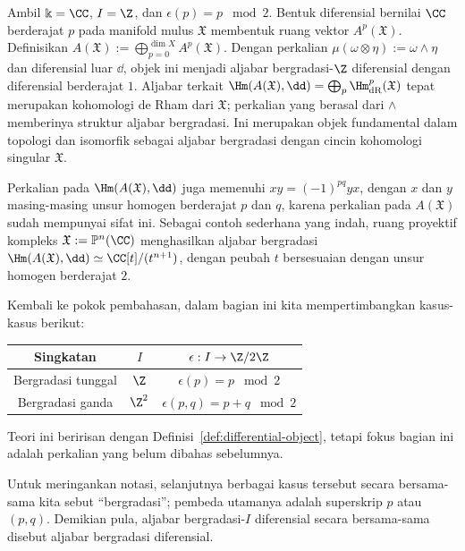 \begin{example}
	Ambil $\Bbbk=\CC$, $I=\Z$, dan $\epsilon(p)=p\;\bmod2$. Bentuk
	diferensial bernilai $\CC$ berderajat $p$ pada manifold mulus
	$\mathfrak{X}$ membentuk ruang vektor $A^p(\mathfrak{X})$. Definisikan
	$A(\mathfrak{X}):=\bigoplus_{p=0}^{\dim X}A^p(\mathfrak{X})$. Dengan
	perkalian $\mu(\omega\otimes\eta):=\omega\wedge\eta$ dan diferensial luar
	$\dd$, objek ini menjadi aljabar bergradasi-$\Z$ diferensial dengan
	diferensial berderajat $1$. Aljabar terkait
	$\Hm(A(\mathfrak{X}),\dd)=\bigoplus_p\Hm^p_{\mathrm{dR}}(\mathfrak{X})$
	tepat merupakan kohomologi de Rham dari $\mathfrak{X}$; perkalian yang
	berasal dari $\wedge$ memberinya struktur aljabar bergradasi. Ini merupakan
	objek fundamental dalam topologi dan isomorfik sebagai aljabar bergradasi
	dengan cincin kohomologi singular $\mathfrak{X}$.

	Perkalian pada $\Hm(A(\mathfrak{X}),\dd)$ juga memenuhi
	$xy=(-1)^{pq}yx$, dengan $x$ dan $y$ masing-masing unsur homogen berderajat
	$p$ dan $q$, karena perkalian pada $A(\mathfrak{X})$ sudah mempunyai sifat
	ini. Sebagai contoh sederhana yang indah, ruang proyektif kompleks
	$\mathfrak{X}:=\mathbb{P}^n(\CC)$ menghasilkan aljabar bergradasi
	$\Hm(A(\mathfrak{X}),\dd)\simeq\CC[t]/(t^{n+1})$, dengan peubah $t$
	bersesuaian dengan unsur homogen berderajat $2$.
\end{example}

Kembali ke pokok pembahasan, dalam bagian ini kita mempertimbangkan kasus-kasus
berikut:
\begin{center}\begin{tabular}{|c|c|c|} \hline
	Singkatan & $I$ & $\epsilon:I\to\Z/2\Z$ \\ \hline
	Bergradasi tunggal & $\Z$ & $\epsilon(p)=p\;\bmod2$ \\
	Bergradasi ganda & $\Z^2$ & $\epsilon(p,q)=p+q\;\bmod2$ \\ \hline
\end{tabular}\end{center}

Teori ini beririsan dengan Definisi~\ref{def:differential-object},
tetapi fokus bagian ini adalah perkalian yang belum dibahas sebelumnya.

Untuk meringankan notasi, selanjutnya berbagai kasus tersebut secara
bersama-sama kita sebut ``bergradasi''; pembeda utamanya adalah
superskrip $p$ atau $(p,q)$. Demikian pula, aljabar bergradasi-$I$
diferensial secara bersama-sama disebut aljabar bergradasi diferensial.

